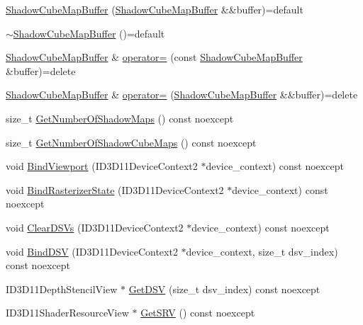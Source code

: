 \begin{DoxyCompactItemize}
\item 
\hyperlink{structmage_1_1_shadow_cube_map_buffer_af2e79caa3f372f164dc59982e3a94ff2}{Shadow\+Cube\+Map\+Buffer} (\hyperlink{structmage_1_1_shadow_cube_map_buffer}{Shadow\+Cube\+Map\+Buffer} \&\&buffer)=default
\item 
\hyperlink{structmage_1_1_shadow_cube_map_buffer_ad84dab42c8391819f93f9e60acd4655d}{$\sim$\+Shadow\+Cube\+Map\+Buffer} ()=default
\item 
\hyperlink{structmage_1_1_shadow_cube_map_buffer}{Shadow\+Cube\+Map\+Buffer} \& \hyperlink{structmage_1_1_shadow_cube_map_buffer_abdb46d337840a5ffd76f12472d520eff}{operator=} (const \hyperlink{structmage_1_1_shadow_cube_map_buffer}{Shadow\+Cube\+Map\+Buffer} \&buffer)=delete
\item 
\hyperlink{structmage_1_1_shadow_cube_map_buffer}{Shadow\+Cube\+Map\+Buffer} \& \hyperlink{structmage_1_1_shadow_cube_map_buffer_aebf8e9d2e0a2ec5bf13dc40b93f97fde}{operator=} (\hyperlink{structmage_1_1_shadow_cube_map_buffer}{Shadow\+Cube\+Map\+Buffer} \&\&buffer)=delete
\item 
size\+\_\+t \hyperlink{structmage_1_1_shadow_cube_map_buffer_a90dd93ff618bc56750bd08cfe6979c23}{Get\+Number\+Of\+Shadow\+Maps} () const noexcept
\item 
size\+\_\+t \hyperlink{structmage_1_1_shadow_cube_map_buffer_ab6832adb714a9685972ece7c410b38ad}{Get\+Number\+Of\+Shadow\+Cube\+Maps} () const noexcept
\item 
void \hyperlink{structmage_1_1_shadow_cube_map_buffer_abc8eb7d1ebf0cafb8b626bc5cc7c4c71}{Bind\+Viewport} (I\+D3\+D11\+Device\+Context2 $\ast$device\+\_\+context) const noexcept
\item 
void \hyperlink{structmage_1_1_shadow_cube_map_buffer_a8bb32b390a2488f00e0b16e4f8879f25}{Bind\+Rasterizer\+State} (I\+D3\+D11\+Device\+Context2 $\ast$device\+\_\+context) const noexcept
\item 
void \hyperlink{structmage_1_1_shadow_cube_map_buffer_a302478177db8ed02a8fb610d308be9a1}{Clear\+D\+S\+Vs} (I\+D3\+D11\+Device\+Context2 $\ast$device\+\_\+context) const noexcept
\item 
void \hyperlink{structmage_1_1_shadow_cube_map_buffer_a67365d28537a2eda63d37b8cc5f2f0bd}{Bind\+D\+SV} (I\+D3\+D11\+Device\+Context2 $\ast$device\+\_\+context, size\+\_\+t dsv\+\_\+index) const noexcept
\item 
I\+D3\+D11\+Depth\+Stencil\+View $\ast$ \hyperlink{structmage_1_1_shadow_cube_map_buffer_a1db641015a14c177b4c504b85905060a}{Get\+D\+SV} (size\+\_\+t dsv\+\_\+index) const noexcept
\item 
I\+D3\+D11\+Shader\+Resource\+View $\ast$ \hyperlink{structmage_1_1_shadow_cube_map_buffer_ae1a6d1a26d482d6d145505b3b63bdb8d}{Get\+S\+RV} () const noexcept
\end{DoxyCompactItemize}
